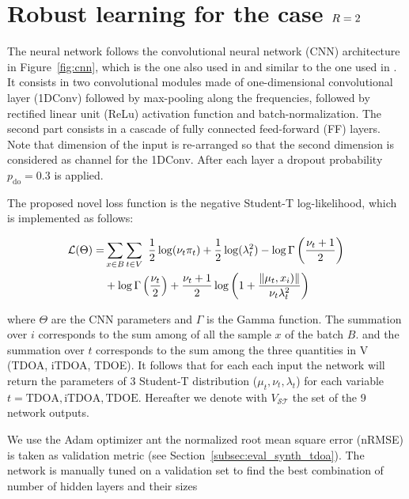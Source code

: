 \section{Robust learning for the case $R = 2$}


The neural network follows the convolutional neural network (CNN) architecture in Figure~\ref{fig:cnn}, which is the one also used in \cite{Nguyen2018} and similar to the one used in \cite{Chakrabarty2017}. It consists in two convolutional modules made of one-dimensional convolutional layer (1DConv) followed by max-pooling along the frequencies, followed by rectified linear unit (ReLu) activation function and batch-normalization.
The second part consists in a cascade of fully connected feed-forward (FF) layers.
Note that dimension of the input is re-arranged so that the second dimension is considered as channel for the 1DConv. After each layer a dropout probability $p_\text{do} = 0.3$ is applied.

The proposed novel loss function is the negative Student-T log-likelihood, which is implemented as follows:

\begin{equation}
\begin{split}
\mathcal{L}(\Theta) =& \sum_{x \in B} \sum_{t \in V}\ \dfrac{1}{2} \log (\nu_t\pi_t)
                        + \dfrac{1}{2} \log(\lambda_t^2)
                        - \log  \Gamma \left( \dfrac{\nu_t+1}{2} \right)\\
                    &    + \log  \Gamma \left( \dfrac{\nu_t}{2} \right)
                        + \dfrac{\nu_t+1}{2}
                        \log \left( 1  + \dfrac{\norm{\mu_t, x_i)}}{\nu_t \lambda_t^2} \right)\\
\end{split}
\end{equation}

where $\Theta$ are the CNN parameters and $\Gamma$ is the Gamma function. The summation over $i$ corresponds to the sum among of all the sample $x$ of the batch $B$. and the summation over $t$ corresponds to the sum among the three quantities in V (TDOA, iTDOA, TDOE). It follows that for each each input the network will return the parameters of 3 Student-T distribution ($\mu_t, \nu_t, \lambda_t$) for each variable $t = { \text{TDOA}, \text{iTDOA}, \text{TDOE} }$. Hereafter we denote with $V_{\mathcal{ST}}$ the set of the 9 network outputs.

We use the Adam optimizer ant the normalized root mean square error (nRMSE) is taken as validation metric (see Section~\ref{subsec:eval_synth_tdoa}). The network is manually tuned on a validation set to find the best combination of number of hidden layers and their sizes


